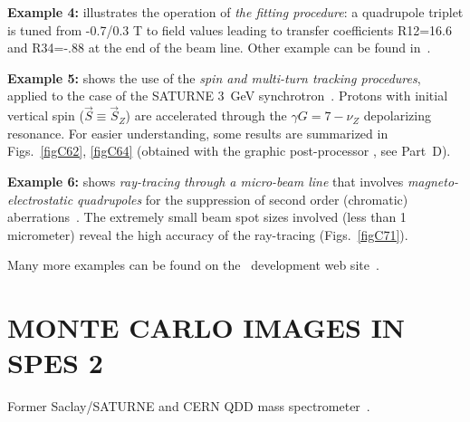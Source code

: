 \bigskip

\noindent\textbf{Example 4:} illustrates the operation of \emph{the fitting
procedure}: a quadrupole triplet is tuned from  -0.7/0.3 T to field values leading to
transfer coefficients  R12=16.6  and R34=-.88  at the end of the beam line.  Other example 
can be found in~\protect\cite{ZgCern}. 

\bigskip


\noindent\textbf{Example 5:} shows the use of the 
\emph{spin and multi-turn tracking procedures}, 
applied to the case of the SATURNE 3~GeV synchrotron~\protect\cite{Biblio3,Biblio7,Grorud}.
 Protons with initial vertical spin  ($\vec S\equiv\vec  S_Z $)  are 
accelerated through the $ \gamma G=7-\nu_ Z $ depolarizing resonance. For 
easier understanding, some results are summarized in Figs.~\ref{figC62}, \ref{figC64} %
(obtained with the graphic post-processor \zpop, see Part~D).

\bigskip 

\noindent\textbf{Example 6:} shows  \emph{ray-tracing through a micro-beam line}
that involves \emph{magneto-electrostatic quadrupoles} for the suppression of 
second order (chromatic) aberrations~\protect\cite{Biblio6}. The extremely small beam 
spot sizes involved (less than 1 micrometer) reveal the high 
accuracy of the ray-tracing (Figs.~\ref{figC71}).   %


\bigskip 

\noindent Many more examples can be found on the \zgoubi\ development web site~\cite{SFZ}.



 \cleardoublepage

\pagestyle{headings}

\section{MONTE CARLO IMAGES IN SPES 2}

\medskip

Former Saclay/SATURNE and CERN QDD mass spectrometer~\cite{Spes2}. 

~


